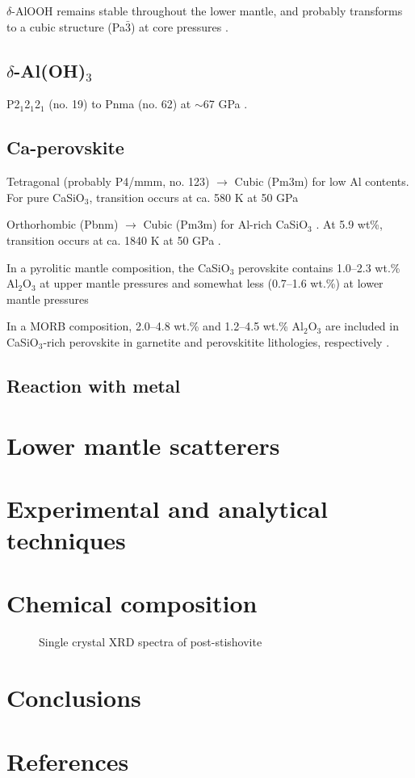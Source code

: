\documentclass[review]{elsarticle}
\begin{document}
$\delta$-AlOOH remains stable throughout the lower mantle, and probably transforms to a cubic structure (Pa$\bar{3}$) at core pressures \citep{TT2011}.

\subsection{$\delta$-Al(OH)$_3$}
P2$_1$2$_1$2$_1$ (no. 19) to Pnma (no. 62) at $\sim$67 GPa \cite{MKISGY2011}.
\cite{XK2007}

\subsection{Ca-perovskite}
Tetragonal (probably P4/mmm, no. 123) \citep{SJD2002} $\rightarrow$ Cubic (Pm3m) for low Al contents. For pure CaSiO$_3$, transition occurs at ca. 580 K at 50 GPa \citep{KHOSO2004, KHSOD2007}

Orthorhombic (Pbnm) $\rightarrow$ Cubic (Pm3m) for Al-rich CaSiO$_3$ \citep{KHOSO2004}. At 5.9 wt\%, transition occurs at ca. 1840 K at 50 GPa \citep{KHOSO2004}.

 In a pyrolitic mantle composition, the CaSiO$_3$ perovskite contains 1.0--2.3 wt.\% Al$_2$O$_3$ at upper mantle pressures and somewhat less (0.7--1.6 wt.\%) at lower mantle pressures \citep{KFS1998, Wood2000, Hirose2002}

 In a MORB composition, 2.0--4.8 wt.\% and 1.2--4.5 wt.\% Al$_2$O$_3$ are included in CaSiO$_3$-rich perovskite in garnetite and perovskitite lithologies, respectively \citep{KFS1994, IR1993, HF2002}.


\subsection{Reaction with metal}
\citep{Terasakietal2012}

\section{Lower mantle scatterers}
\cite{DAD2013}
\cite{KH1998,KH2003}
\cite{NKF2003}
\cite{KBSW2001}
\cite{Kaneshima2009}
\cite{BSBIWJ2010}
\cite{KHSBIWJ2010}
\cite{BR2014}
\cite{AHOHOM2013}
\cite{Mookherjee2011}

\section{Experimental and analytical techniques}

\section{Chemical composition}
\begin{figure}[ht!]
  \centering
  \caption{Single crystal XRD spectra of post-stishovite}
  \label{fig:xrd_post_stv}
\end{figure}

\section{Conclusions}



\clearpage
\section*{References}


\end{document}

